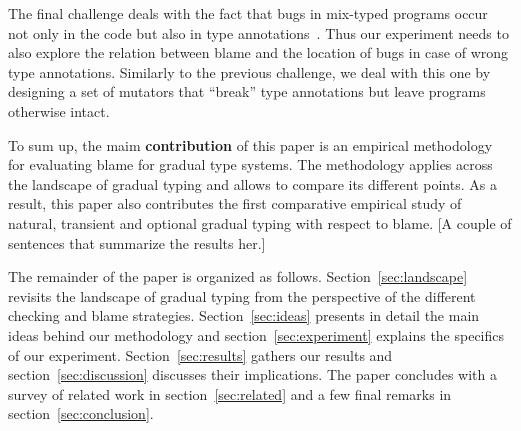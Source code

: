 The final challenge deals with the fact that bugs in mix-typed programs
occur not only in the code but also in type
annotations~\cite{sta-nt-base-types, incorrect-ts, wmwz-ecoop-2017}. Thus
our experiment needs to also explore the relation between blame and the
location of bugs in case of wrong type annotations. Similarly to the previous challenge, we
deal with this one by designing a set of mutators that ``break'' type
annotations but leave programs otherwise intact. 

To sum up, the maim {\bf contribution} of this paper is an empirical  methodology for
evaluating blame for gradual type systems. The methodology applies across the
landscape of gradual typing and allows to compare its different points. 
  As a result, this paper also contributes the first comparative
empirical study of natural, transient and optional gradual typing
with respect to blame. [A couple of sentences that summarize the results
her.]

The remainder of the paper is organized as follows.
Section~\ref{sec:landscape} revisits the landscape of gradual typing from
the perspective of the different checking and blame strategies.
Section~\ref{sec:ideas} presents in detail the main ideas behind our
methodology and section~\ref{sec:experiment} explains the specifics of our
experiment. Section~\ref{sec:results} gathers our results and
section~\ref{sec:discussion} discusses their implications. The paper
concludes with a survey of related work in section~\ref{sec:related} and 
a few final remarks in section~\ref{sec:conclusion}.



